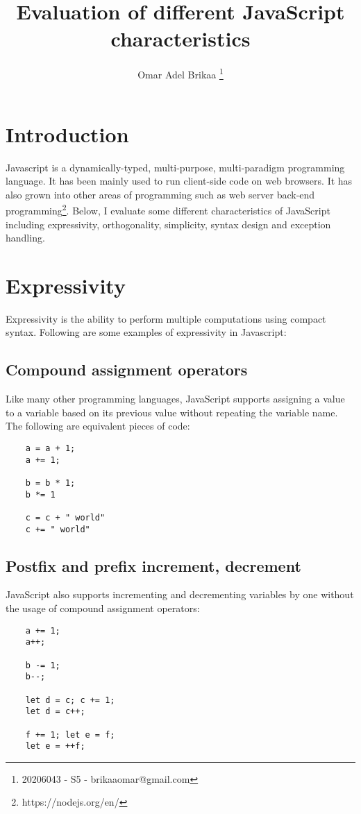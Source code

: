 \documentclass[11pt,a4paper]{article}
\begin{document}
\title{Evaluation of different JavaScript characteristics}
\author{Omar Adel Brikaa \thanks{20206043 - S5 - brikaaomar@gmail.com}}
\date{}
\maketitle

\tableofcontents

\section{Introduction}
Javascript is a dynamically-typed, multi-purpose, multi-paradigm programming language. It has been mainly used to run
client-side code on web browsers. It has also grown into other areas of programming such as web server back-end
programming\footnote{https://nodejs.org/en/}. Below, I evaluate some different characteristics of JavaScript including
expressivity, orthogonality, simplicity, syntax design and exception handling.

\section{Expressivity}
Expressivity is the ability to perform multiple computations using compact syntax. Following are some examples
of expressivity in Javascript:

\subsection{Compound assignment operators}
Like many other programming languages, JavaScript supports assigning a value to a variable based on its previous value
without repeating the variable name. The following are equivalent pieces of code:
\begin{verbatim}
    a = a + 1;
    a += 1;

    b = b * 1;
    b *= 1

    c = c + " world"
    c += " world"
\end{verbatim}

\subsection{Postfix and prefix increment, decrement}
JavaScript also supports incrementing and decrementing variables by one without the usage of compound assignment
operators:
\begin{verbatim}
    a += 1;
    a++;

    b -= 1;
    b--;

    let d = c; c += 1;
    let d = c++;

    f += 1; let e = f;
    let e = ++f;
\end{verbatim}
\end{document}
